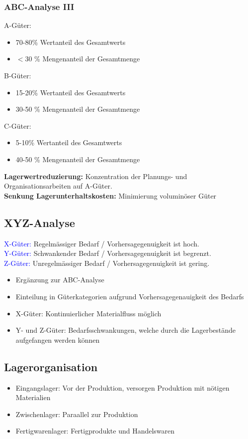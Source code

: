 \documentclass[../ZF_Wing.tex]{subfiles}
\begin{document}
\subsubsection{ABC-Analyse III}
\colorbox {red!30}{A-Güter:}
\begin{itemize}
	\item 70-80\% Wertanteil des Gesamtwerts
	\item $<$30 \% Mengenanteil der Gesamtmenge
\end{itemize}
\colorbox {red!30}{B-Güter:}
\begin{itemize}
	\item 15-20\% Wertanteil des Gesamtwerts
	\item 30-50 \% Mengenanteil der Gesamtmenge
\end{itemize}
\colorbox {red!30}{C-Güter:}
\begin{itemize}
	\item 5-10\% Wertanteil des Gesamtwerts
	\item 40-50 \% Mengenanteil der Gesamtmenge
\end{itemize}
\textbf{Lagerwertreduzierung:} Konzentration der Planungs- und Organisationsarbeiten auf A-Güter.\\
\textbf{Senkung Lagerunterhaltskosten:} Minimierung voluminöser Güter\\

\subsection{XYZ-Analyse}
\textcolor {blue} {X-Güter:} Regelmässiger Bedarf / Vorhersagegenuigkeit ist hoch.\\\textcolor {blue} {Y-Güter:} Schwankender Bedarf / Vorhersagegenuigkeit ist begrenzt.\\
\textcolor {blue} {Z-Güter:} Unregelmässiger Bedarf / Vorhersagegenuigkeit ist gering.\\

\begin{itemize}
	\item Ergänzung zur ABC-Analyse
	\item Einteilung in Güterkategorien aufgrund Vorhersagegenauigkeit des Bedarfs
	\item X-Güter: Kontinuierlicher Materialfluss möglich
	\item Y- und Z-Güter: Bedarfsschwankungen, welche durch die Lagerbestände aufgefangen werden können
\end{itemize}

\subsection{Lagerorganisation}
\begin{itemize}
	\item Eingangslager: Vor der Produktion, versorgen Produktion mit nötigen Materialien
	\item Zwischenlager: Paraallel zur Produktion
	\item Fertigwarenlager: Fertigprodukte und Handelswaren
\end{itemize}
\end{document}
